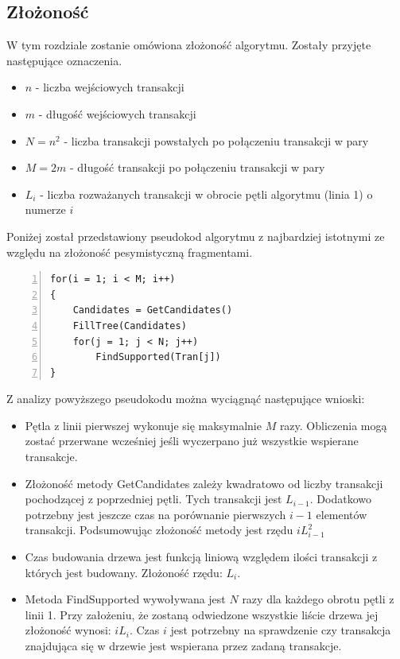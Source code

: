 \documentclass[a4paper,12pt]{article}
\begin{document}
\subsection{Złożoność}
W tym rozdziale zostanie omówiona złożoność algorytmu. Zostały przyjęte następujące oznaczenia.
\begin{itemize}
\item $ n$ - liczba wejściowych transakcji
\item $ m$ - długość wejściowych transakcji
\item $ N = n^2$ - liczba transakcji powstałych po połączeniu transakcji w pary
\item $ M = 2m$ - długość transakcji po połączeniu transakcji w pary
\item $ L_i$ - liczba rozważanych transakcji w obrocie pętli algorytmu (linia 1) o numerze $i$
\end{itemize}
Poniżej został przedstawiony pseudokod algorytmu z najbardziej istotnymi ze względu na złożoność pesymistyczną fragmentami.

\begin{center}
\begin{lstlisting}[numbers=left]
for(i = 1; i < M; i++)
{
	Candidates = GetCandidates()
	FillTree(Candidates)
	for(j = 1; j < N; j++)
		FindSupported(Tran[j])
}
\end{lstlisting}
\end{center}

Z analizy powyższego pseudokodu można wyciągnąć następujące wnioski:
\begin{itemize}
\item Pętla z linii pierwszej wykonuje się maksymalnie $M$ razy. Obliczenia mogą zostać przerwane wcześniej jeśli wyczerpano już wszystkie wspierane transakcje.
\item Złożoność metody GetCandidates zależy kwadratowo od liczby transakcji pochodzącej z poprzedniej pętli. Tych transakcji jest $L_{i-1}$. Dodatkowo potrzebny jest jeszcze czas na porównanie pierwszych $i-1$ elementów transakcji. Podsumowując złożoność metody jest rzędu $iL_{i-1}^2$
\item Czas budowania drzewa jest funkcją liniową względem ilości transakcji z których jest budowany. Złożoność rzędu: $L_i$.
\item Metoda FindSupported wywoływana jest $N$ razy dla każdego obrotu pętli z linii 1.  Przy założeniu, że zostaną odwiedzone wszystkie liście drzewa jej złożoność wynosi: $iL_i$. Czas $i$ jest potrzebny na sprawdzenie czy transakcja znajdująca się w drzewie jest wspierana przez zadaną transakcje.
\end{itemize}
\end{document}
